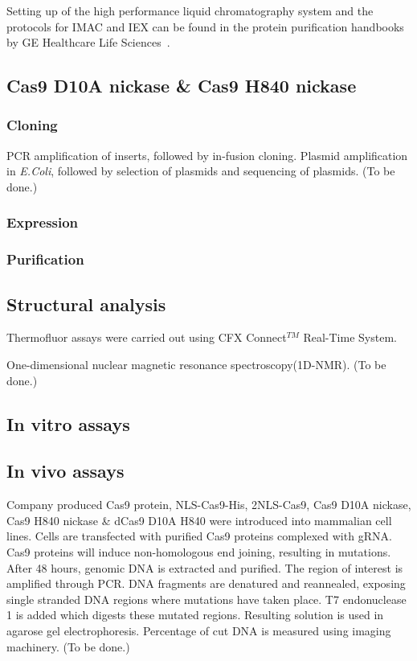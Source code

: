 \documentclass[11pt]{article}
\begin{document}
Setting up of the high performance liquid chromatography system and the protocols for IMAC and IEX can be found in the protein purification handbooks by GE Healthcare Life Sciences~\citep{GE2016}.

\subsection{Cas9 D10A nickase \& Cas9 H840 nickase}
\subsubsection{Cloning}
PCR amplification of inserts, followed by in-fusion cloning. Plasmid amplification in \textit{E.Coli}, followed by selection of plasmids and sequencing of plasmids. (To be done.)

\subsubsection{Expression}


\subsubsection{Purification}


\subsection{Structural analysis}
Thermofluor assays were carried out using CFX Connect$^{TM}$ Real-Time System.

One-dimensional nuclear magnetic resonance spectroscopy(1D-NMR). (To be done.)

\subsection{In vitro assays}

\subsection{In vivo assays}
Company produced Cas9 protein, NLS-Cas9-His, 2NLS-Cas9, Cas9 D10A nickase, Cas9 H840 nickase \& dCas9 D10A H840 were introduced into mammalian cell lines. Cells are transfected with purified Cas9 proteins complexed with gRNA. Cas9 proteins will induce non-homologous end joining, resulting in mutations. After 48 hours, genomic DNA is extracted and purified. The region of interest is amplified through PCR. DNA fragments are denatured and reannealed, exposing single stranded DNA regions where mutations have taken place. T7 endonuclease 1 is added which digests these mutated regions. Resulting solution is used in agarose gel electrophoresis. Percentage of cut DNA is measured using imaging machinery. (To be done.)
\end{document}
